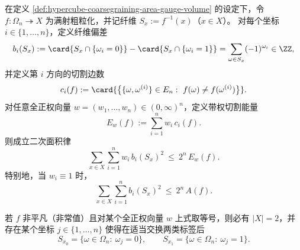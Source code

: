 
\begin{theorem}\label{thm:fold-coarsegraining-quadratic-stokes-area-rigidity}
在定义 \ref{def:hypercube-coarsegraining-area-gauge-volume} 的设定下，令 \(f:\Omega_n\twoheadrightarrow X\) 为满射粗粒化，并记纤维 \(S_x:=f^{-1}(x)\)（\(x\in X\)）。
对每个坐标 \(i\in\{1,\dots,n\}\)，定义纤维偏差
\[
b_i(S_x):=\card{S_x\cap\{\omega_i=0\}}-\card{S_x\cap\{\omega_i=1\}}
=\sum_{\omega\in S_x}(-1)^{\omega_i}\in\ZZ,
\]
并定义第 \(i\) 方向的切割边数
\[
c_i(f):=\card{\bigl\{\{\omega,\omega^{(i)}\}\in E_n:\ f(\omega)\neq f(\omega^{(i)})\bigr\}}.
\]
对任意全正权向量 \(w=(w_1,\dots,w_n)\in(0,\infty)^n\)，定义带权切割能量
\[
E_w(f):=\sum_{i=1}^n w_i\,c_i(f).
\]
则成立二次面积律
\[
\boxed{\;\sum_{x\in X}\sum_{i=1}^n w_i\,b_i(S_x)^2\ \le\ 2^n\,E_w(f).\;}
\]
特别地，当 \(w_i\equiv 1\) 时，
\[
\boxed{\;\sum_{x\in X}\sum_{i=1}^n b_i(S_x)^2\ \le\ 2^n\,A(f).\;}
\]

若 \(f\) 非平凡（非常值）且对某个全正权向量 \(w\) 上式取等号，则必有 \(|X|=2\)，并存在某个坐标 \(j\in\{1,\dots,n\}\) 使得在适当交换两类标签后
\[
S_{x_0}=\{\omega\in\Omega_n:\ \omega_j=0\},
\qquad
S_{x_1}=\{\omega\in\Omega_n:\ \omega_j=1\}.
\]
\end{theorem}

